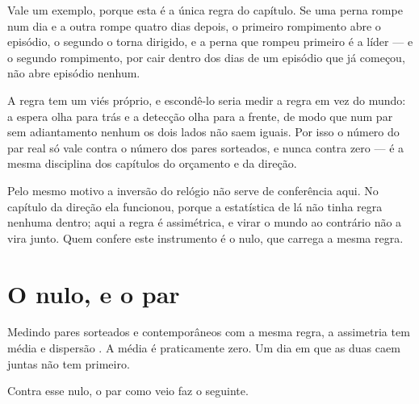 Vale um exemplo, porque esta é a única regra do capítulo. Se uma perna rompe num dia e a outra rompe
quatro dias depois, o primeiro rompimento abre o episódio, o segundo o torna dirigido, e a perna que
rompeu primeiro é a líder --- e o segundo rompimento, por cair dentro dos
\numConjuntaJanelaEpisodio{} dias de um episódio que já começou, não abre episódio nenhum.

A regra tem um viés próprio, e escondê-lo seria medir a regra em vez do mundo: a espera olha para
trás e a detecção olha para a frente, de modo que num par sem adiantamento nenhum os dois lados não
saem iguais. Por isso o número do par real só vale contra o número dos pares sorteados, e nunca
contra zero --- é a mesma disciplina dos capítulos do orçamento e da direção.

Pelo mesmo motivo a inversão do relógio não serve de conferência aqui. No capítulo da direção ela
funcionou, porque a estatística de lá não tinha regra nenhuma dentro; aqui a regra é assimétrica, e
virar o mundo ao contrário não a vira junto. Quem confere este instrumento é o nulo, que carrega a
mesma regra.

\section{O nulo, e o par}

Medindo \numConjuntaNulos{} pares sorteados e contemporâneos com a mesma regra, a assimetria tem
média \numConjuntaNuloMedia{} e dispersão \numConjuntaNuloDispersao{}. A média é praticamente zero. Um dia em que as duas caem juntas não tem
primeiro.

Contra esse nulo, o par como veio faz o seguinte.

\begin{table}[htbp]
  \centering
  \small
  \caption{Os episódios dirigidos no par, por janela. A janela é quanto tempo se espera pela
    segunda perna depois de a primeira ter rompido.}
  \label{tab:episodios}
\end{table}

